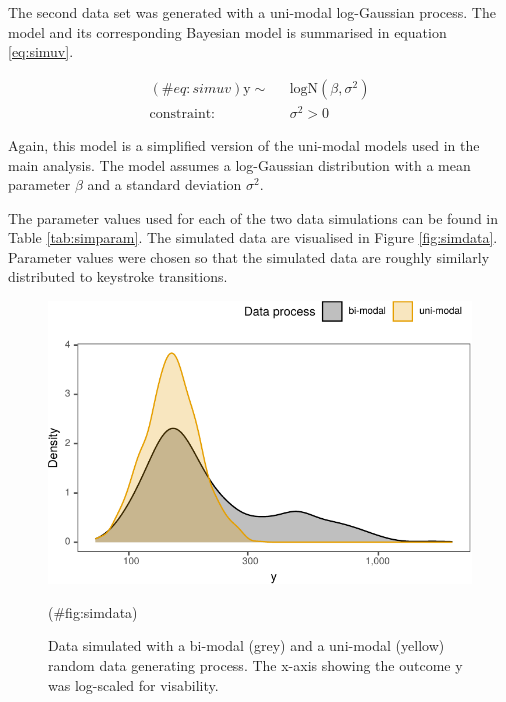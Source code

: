 \begin{appendix}
The second data set was generated with a uni-modal log-Gaussian process.
The model and its corresponding Bayesian model is summarised in equation
\ref{eq:simuv}.

\begin{equation}
\begin{aligned}
(\#eq:simuv)
\text{y} \sim\text{ }& \text{logN}(\beta, \sigma^2)\\
\text{constraint: } & \sigma^2>0
\end{aligned}
\end{equation}

Again, this model is a simplified version of the uni-modal models used
in the main analysis. The model assumes a log-Gaussian distribution with
a mean parameter \(\beta\) and a standard deviation \(\sigma^2\).

The parameter values used for each of the two data simulations can be
found in Table \ref{tab:simparam}. The simulated data are visualised in
Figure \ref{fig:simdata}. Parameter values were chosen so that the
simulated data are roughly similarly distributed to keystroke
transitions.

\begin{figure}

{\centering \includegraphics{manuscript_files/figure-latex/simdata-1} 

}

\caption{Data simulated with a bi-modal (grey) and a uni-modal (yellow) random data generating process. The x-axis showing the outcome y was log-scaled for visability.}(\#fig:simdata)
\end{figure}


\end{appendix}
